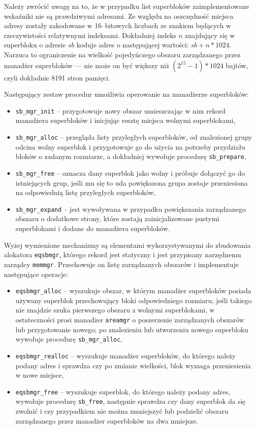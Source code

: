 \documentclass[12pt,a4paper,titlepage,twoside]{mwart}
\begin{document}
Należy zwrócić uwagę na to, że w przypadku list superbloków zaimplementowane
wskaźniki nie są prawdziwymi adresami. Ze względu na oszczędność miejsca adresy
zostały zakodowane w 16--bitowych liczbach ze znakiem będących w rzeczywistości
relatywnymi indeksami. Dokładniej indeks $n$ znajdujący się w superbloku o
adresie $sb$ koduje adres o następującej wartości: $sb + n * 1024$. Narzuca to
ograniczenie na wielkość pojedyńczego obszaru zarządzanego przez manadżer
superbloków --- nie może on być większy niż $(2^{15} - 1) * 1024$ bajtów, czyli
dokładnie 8191 stron pamięci.

Następujący zestaw procedur umożliwia operowanie na manadżerze superbloków:
\begin{itemize}
\item \verb+sb_mgr_init+ -- przygotowuje nowy obszar umieszczając w nim rekord
manadżera superbloków i inicjując resztę miejsca wolnymi superblokami,
\item \verb+sb_mgr_alloc+ -- przegląda listy przyległych superbloków, od
znalezionej grupy odcina wolny superblok i przygotowuje go do użycia na
potrzeby przydziału bloków o zadanym rozmiarze, a dokładniej wywołuje procedurę
\verb+sb_prepare+,
\item \verb+sb_mgr_free+ -- oznacza dany superblok jako wolny i próbuje
dołączyć go do istniejących grup, jeśli mu się to uda powiększona grupa zostaje
przeniesiona na odpowiednią listę przyległych superbloków,
\item \verb+sb_mgr_expand+ -- jest wywoływana w przypadku powiększania
zarządzanego obszaru o dodatkowe strony, które zostają zainicjalizowane pustymi
superblokami i dodane do manadżera superbloków.
\end{itemize}

Wyżej wymienione mechanizmy są elementami wykorzystywanymi do zbudowania
alokatora \texttt{eqsbmgr}, którego rekord jest statyczny i jest przypisany
narzędnemu zarządcy \texttt{memmgr}. Przechowuje on listę zarządzanych
obszarów i implementuje następujące operacje:

\begin{itemize}
\item \verb+eqsbmgr_alloc+ -- wyszukuje obszar, w którym manadżer superbloków
posiada używany superblok przechowujący bloki odpowiedniego rozmiaru, jeśli
takiego nie znajdzie szuka pierwszego obszaru z wolnymi superblokami, w
ostateczności prosi manadżer \texttt{areamgr} o poszerzenie zarządzanych
obszarów lub przygotowanie nowego; po znalezieniu lub utworzeniu nowego
superbloku wywołuje procedurę \verb+sb_mgr_alloc+,
\item \verb+eqsbmgr_realloc+ -- wyszukuje manadżer superbloków, do którego
należy podany adres i sprawdza czy po zmianie wielkości, blok wymaga
przeniesienia w nowe miejsce,
\item \verb+eqsbmgr_free+ -- wyszukuje superblok, do którego należy
podany adres, wywołuje procedurę \verb+sb_free+, następnie sprawdza czy dany
superblok da się zwolnić i czy przypadkiem nie można zmniejszyć lub podzielić
obszaru zarządzanego przez manadżer superbloków na dwa mniejsze.
\end{itemize}
\end{document}
